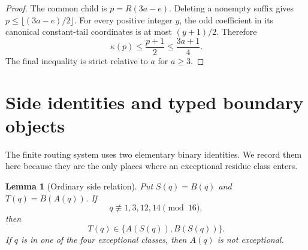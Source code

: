 \documentclass[11pt]{article}
\newtheorem{lemma}[theorem]{Lemma}
\begin{document}
\begin{proof}
The common child is $p=R(3a-e)$. Deleting a nonempty suffix gives
$p\le\lfloor(3a-e)/2\rfloor$. For every positive integer $y$, the odd
coefficient in its canonical constant-tail coordinates is at most $(y+1)/2$.
Therefore
\[
 \kappa(p)\le\frac{p+1}{2}\le\frac{3a+1}{4}.
\]
The final inequality is strict relative to $a$ for $a\ge3$.
\end{proof}

\section{Side identities and typed boundary objects}

The finite routing system uses two elementary binary identities. We record
them here because they are the only places where an exceptional residue class
enters.

\begin{lemma}[Ordinary side relation]\label{lem:side}
Put $S(q)=B(q)$ and $T(q)=B(A(q))$. If
\[
  q\not\equiv1,3,12,14\pmod{16},
\]
then
\[
  T(q)\in\{A(S(q)),B(S(q))\}.
\]
If $q$ is in one of the four exceptional classes, then $A(q)$ is not
exceptional.
\end{lemma}
\end{document}
